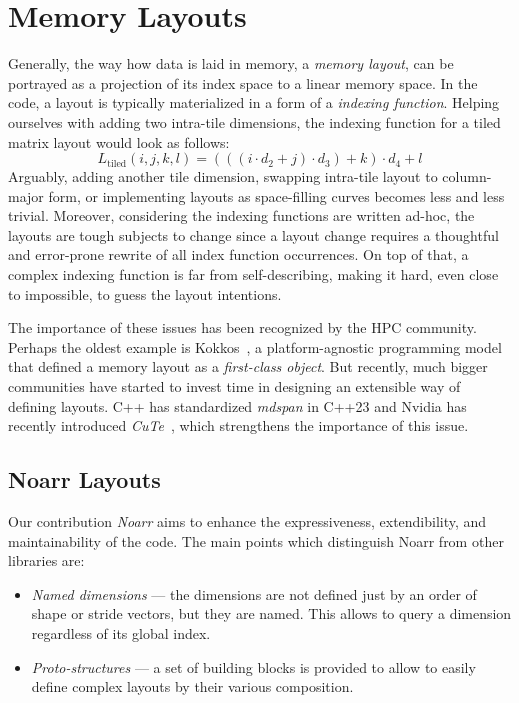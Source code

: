\section{Memory Layouts}
\label{sec:layouts}

Generally, the way how data is laid in memory, a \emph{memory layout}, can be portrayed as a projection of its index space to a linear memory space. In the code, a layout is typically materialized in a form of a \emph{indexing function}.  Helping ourselves with adding two intra-tile dimensions, the indexing function for a tiled matrix layout would look as follows:
$$L_{\text{tiled}}(i,j,k,l) = (((i \cdot d_2 + j) \cdot d_3) + k) \cdot d_4 + l$$
Arguably, adding another tile dimension, swapping intra-tile layout to column-major form, or implementing layouts as space-filling curves becomes less and less trivial. Moreover, considering the indexing functions are written ad-hoc, the layouts are tough subjects to change since a layout change requires a thoughtful and error-prone rewrite of all index function occurrences. On top of that, a complex indexing function is far from self-describing, making it hard, even close to impossible, to guess the layout intentions.

The importance of these issues has been recognized by the HPC community. Perhaps the oldest example is Kokkos~\cite{CARTEREDWARDS20143202}, a platform-agnostic programming model that defined a memory layout as a \emph{first-class object}. But recently, much bigger communities have started to invest time in designing an extensible way of defining layouts. C++ has standardized \emph{mdspan} in C++23 and Nvidia has recently introduced \emph{CuTe}~\cite{cute-online}, which strengthens the importance of this issue.

\subsection{Noarr Layouts}

Our contribution \emph{Noarr} aims to enhance the expressiveness, extendibility, and maintainability of the code. The main points which distinguish Noarr from other libraries are:

\begin{itemize}
  \item \emph{Named dimensions} --- the dimensions are not defined just by an order of shape or stride vectors, but they are named. This allows to query a dimension regardless of its global index.
  \item \emph{Proto-structures} --- a set of building blocks is provided to allow to easily define complex layouts by their various composition.
\end{itemize}

